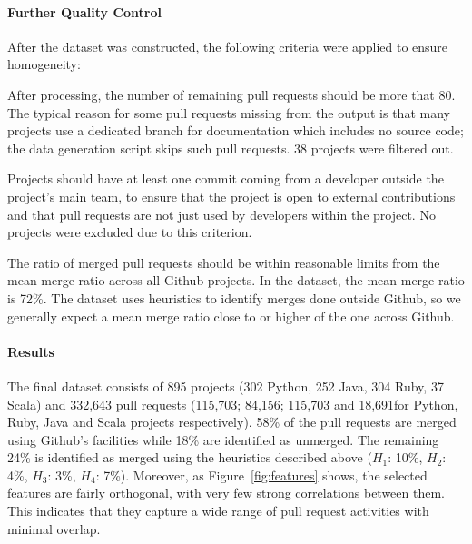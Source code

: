 \documentclass{sig-alternate}
\begin{document}
\paragraph*{Further Quality Control}
After the dataset was constructed, the following criteria were applied to 
ensure homogeneity:

\begin{compactitem}

  \item After processing, the number of remaining pull requests should be more
    that 80. The typical reason for some pull requests missing from the output
    is that many projects use a dedicated branch for documentation which
    includes no source code; the data generation script skips such pull
    requests. 38 projects were filtered out.

  \item Projects should have at least one commit coming from a developer outside
    the project's main team, to ensure that the project is open to external
    contributions and that pull requests are not just used by developers within
    the project. No projects were excluded due to this criterion. 

  \item The ratio of merged pull requests should be within reasonable limits
    from the mean merge ratio across all Github projects. In the \ghtorrent
    dataset, the mean merge ratio is 72\%. The \pullreqs dataset uses heuristics
    to identify merges done outside Github, so we generally expect a mean merge
    ratio close to or higher of the one across Github.

\end{compactitem}

\paragraph*{Results} The final dataset consists of 895 projects (302 Python, 252 Java, 304 Ruby, 37
Scala) and 332,643 pull requests (115,703; 84,156; 115,703 and 18,691for Python,
Ruby, Java and Scala projects respectively). 58\% of the pull requests are
merged using Github's facilities while 18\% are identified as unmerged.
The remaining 24\% is identified as merged using the heuristics described
above ($H_1$: 10\%, $H_2$: 4\%, $H_3$: 3\%, $H_4$: 7\%).
Moreover, as Figure~\ref{fig:features} shows,
the selected features are fairly orthogonal, with very few strong correlations
between them. This indicates that they capture a wide range of pull
request activities with minimal overlap.
\end{document}
